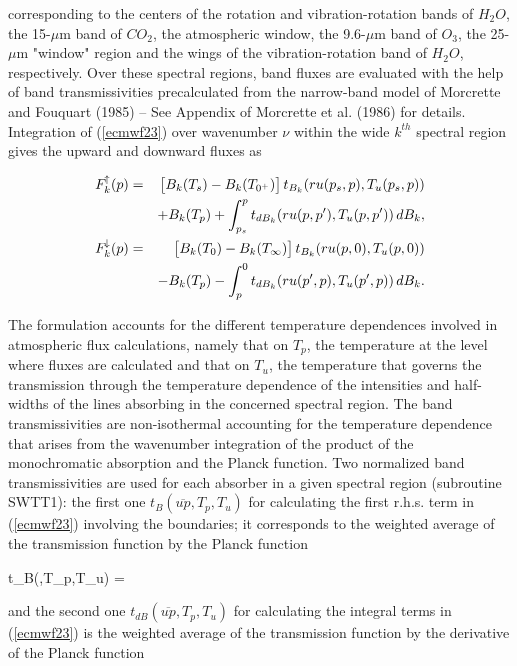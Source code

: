 \noindent corresponding to the centers of the rotation and vibration-rotation bands of $H_2O$, the 15-$\mu$m band of $CO_2$, the atmospheric window, the 9.6-$\mu$m band of $O_3$, the 25-$\mu$m "window" region and the wings of the vibration-rotation band of $H_2O$, respectively. Over these spectral regions, band fluxes are evaluated with the help of band transmissivities precalculated from the narrow-band model of Morcrette and Fouquart (1985) -- See Appendix of Morcrette et al. (1986) for details.\\

Integration of (\ref{ecmwf23}) over wavenumber $\nu$ within the wide $k^{th}$
spectral region gives the upward and downward fluxes as

\medskip
\begin{eqnarray}\label{ecmwf25}
F_{k}^{\!\uparrow}(p) &=&
\bigl[B_{k}(T_s) - B_{k}(T_{0^{+}})\bigr] \, t_{B_k}(ru(p_s,p),T_u(p_s,p))\cr & &
+ B_{k}(T_p)+ \int_{p_s}^p{t_{dB_k}(ru(p,p'),T_u(p,p')) \, dB_{k}}, \cr
F_{k}^{\!\downarrow}(p) &=&
\bigl[B_{k}(T_0) - B_{k}(T_{\infty})\bigr] \, t_{B_k}(ru(p,0),T_u(p,0))\cr & &
- B_{k}(T_p)  - \int_{p}^0{t_{dB_k}(ru(p',p),T_u(p',p)) \, dB_{k}}.
\end{eqnarray}
\medskip

The formulation accounts for the different temperature dependences involved in atmospheric flux calculations, namely that on $T_p$, the temperature at the level where fluxes are calculated and that on $T_u$, the temperature that governs the transmission through the temperature dependence of the intensities and half-widths of the lines absorbing in the concerned spectral region. The band transmissivities are non-isothermal accounting for the temperature dependence that arises from the wavenumber integration of the product of the monochromatic absorption and the Planck function. Two normalized band transmissivities are used for each absorber in a given spectral region (subroutine SWTT1): the first one $t_B(\overline{up},T_p,T_u)$ for calculating the first r.h.s. term in (\ref{ecmwf23}) involving the boundaries; it corresponds to the weighted average of the transmission function by the Planck function

\medskip
\be
t_B(,T_p,T_u) = 
\label{ecmwf26a}
\ee
\medskip

\noindent and the second one $t_{dB}(\overline{up},T_p,T_u)$ for calculating the integral terms in (\ref{ecmwf23}) is the weighted average of the transmission function by the derivative of the Planck function

